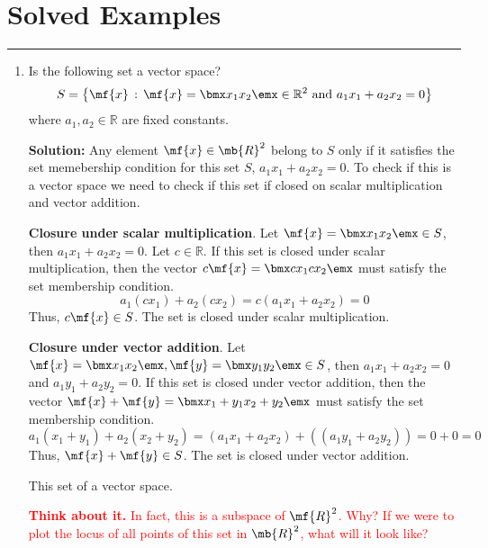 \section{Solved Examples}
\vspace{-0.5cm}
\begin{center}
    \rule{\textwidth}{1pt}
\end{center}

\begin{enumerate}
    \item Is the following set a vector space?
    $$S = \left\{ \mf{x} \, : \, \mf{x} = \bmx x_1 \\ x_2 \emx \in \mathbb{R}^2 \text{ and } a_1x_1 + a_2 x_2 = 0 \right\}$$
    where $a_1, a_2 \in \mathbb{R}$ are fixed constants.
    \begin{boxedstuff}
        \vspace{4mm}
        \textbf{Solution:} Any element $\mf{x} \in \mb{R}^2$ belong to $S$ only if it satisfies the set memebership condition for this set $S$, $a_1x_1 + a_2 x_2 = 0$. To check if this is a vector space we need to check if this set if closed on scalar multiplication and vector addition.

        \textbf{Closure under scalar multiplication}. Let $\mf{x} = \bmx x_1 \\ x_2 \emx \in S$, then $a_1x_1 + a_2x_2 = 0$. Let $c \in \mathbb{R}$. If this set is closed under scalar multiplication, then the vector $c\mf{x} = \bmx cx_1 \\ cx_2 \emx$ must satisfy the set membership condition. 
        $$a_1(cx_1) + a_2(cx_2) = c(a_1x_1 + a_2x_2) = 0$$ 
        Thus, $c\mf{x} \in S$. The set is closed under scalar multiplication.

        \textbf{Closure under vector addition}. Let $\mf{x} = \bmx x_1 \\ x_2 \emx,  \mf{y} = \bmx y_1 \\ y_2 \emx \in S$, then $a_1x_1 + a_2x_2 = 0$ and $a_1y_1 + a_2y_2 = 0$. If this set is closed under vector addition, then the vector $\mf{x} +\mf{y} = \bmx x_1 + y_1 \\ x_2 + y_2 \emx$ must satisfy the set membership condition.
        $$a_1(x_1 + y_1) + a_2(x_2 + y_2) = (a_1x_1 + a_2x_2) + ((a_1y_1 + a_2y_2)) = 0 + 0 = 0$$ 
        Thus, $\mf{x} + \mf{y} \in S$. The set is closed under vector addition.

        This set of a vector space.

        \textcolor{red}{\textbf{Think about it.} In fact, this is a subspace of $\mf{R}^2$. Why? If we were to plot the locus of all points of this set in $\mb{R}^2$, what will it look like?}
    \end{boxedstuff}
    


\end{enumerate}
